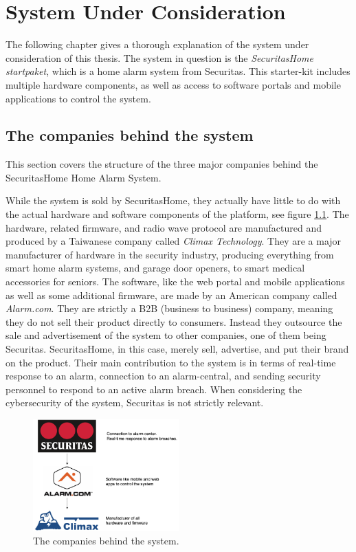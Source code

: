 \chapter{System Under Consideration} \label{ch:system}
The following chapter gives a thorough explanation of the system under consideration of this thesis. The system in question is the \textit{SecuritasHome startpaket}, which is a home alarm system from Securitas. This starter-kit includes multiple hardware components, as well as access to software portals and mobile applications to control the system.

\section{The companies behind the system}
This section covers the structure of the three major companies behind the SecuritasHome Home Alarm System.

While the system is sold by SecuritasHome, they actually have little to do with the actual hardware and software components of the platform, see figure \ref{fig:company-structure}. The hardware, related firmware, and radio wave protocol are manufactured and produced by a Taiwanese company called \textit{Climax Technology}. They are a major manufacturer of hardware in the security industry, producing everything from smart home alarm systems, and garage door openers, to smart medical accessories for seniors. The software, like the web portal and mobile applications as well as some additional firmware, are made by an American company called \textit{Alarm.com}. They are strictly a B2B (business to business) company, meaning they do not sell their product directly to consumers. Instead they outsource the sale and advertisement of the system to other companies, one of them being Securitas. SecuritasHome, in this case, merely sell, advertise, and put their brand on the product. Their main contribution to the system is in terms of real-time response to an alarm, connection to an alarm-central, and sending security personnel to respond to an active alarm breach. When considering the cybersecurity of the system, Securitas is not strictly relevant.
\begin{figure}[!ht]
  \begin{center}
    \includegraphics[width=0.5\textwidth]{images/company-structure.png}
  \end{center}
  \caption{The companies behind the system.}
  \label{fig:company-structure}
\end{figure}

